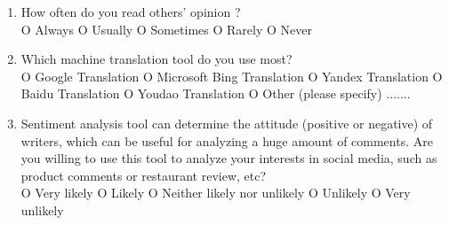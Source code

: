\documentclass[conference]{IEEEtran}
\begin{document}
\begin{enumerate}
\item How often do you read others' opinion ?\\
  O Always O Usually O Sometimes O Rarely O Never



\item Which machine translation tool do you use most?\\
  O Google Translation O Microsoft Bing Translation O Yandex Translation O Baidu
  Translation O Youdao Translation O Other (please specify) .......
\item Sentiment analysis tool can determine the attitude (positive or negative)
  of writers, which can be useful for analyzing a huge amount of comments. Are
  you willing to use this tool to analyze your interests in social
  media, such as product comments or restaurant review, etc?\\
  O Very likely O Likely O Neither likely nor unlikely O Unlikely O Very unlikely
\end{enumerate}


\end{document}
